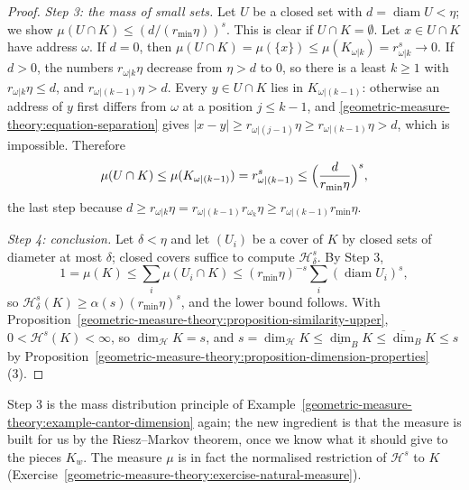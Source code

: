 \begin{proof}
\emph{Step 3: the mass of small sets.} Let $U$ be a closed set with $d = \operatorname{diam}U < \eta$; we show $\mu(U \cap K) \leq (d/(r_{\min}\eta))^s$. This is clear if $U \cap K = \emptyset$. Let
$x \in U \cap K$ have address $\omega$. If $d = 0$, then $\mu(U \cap K) = \mu(\{x\}) \leq \mu(K_{\omega|k}) = r_{\omega|k}^s \to 0$. If $d > 0$, the numbers $r_{\omega|k}\eta$ decrease from $\eta > d$ to $0$,
so there is a least $k \geq 1$ with $r_{\omega|k}\eta \leq d$, and $r_{\omega|(k - 1)}\eta > d$. Every $y \in U \cap K$ lies in $K_{\omega|(k - 1)}$: otherwise an address of $y$ first differs from
$\omega$ at a position $j \leq k - 1$, and \eqref{geometric-measure-theory:equation-separation} gives $|x - y| \geq r_{\omega|(j - 1)}\eta \geq r_{\omega|(k - 1)}\eta > d$, which is impossible. Therefore
\[
\mu(U \cap K) \leq \mu(K_{\omega|(k - 1)}) = r_{\omega|(k - 1)}^s \leq \Bigl(\frac{d}{r_{\min}\eta}\Bigr)^s,
\]
the last step because $d \geq r_{\omega|k}\eta = r_{\omega|(k - 1)}r_{\omega_k}\eta \geq r_{\omega|(k - 1)}r_{\min}\eta$.

\emph{Step 4: conclusion.} Let $\delta < \eta$ and let $(U_i)$ be a cover of $K$ by closed sets of diameter at most $\delta$; closed covers suffice to compute $\mathcal{H}^s_\delta$. By Step 3,
\[
1 = \mu(K) \leq \sum_i\mu(U_i \cap K) \leq (r_{\min}\eta)^{-s}\sum_i(\operatorname{diam}U_i)^s,
\]
so $\mathcal{H}^s_\delta(K) \geq \alpha(s)(r_{\min}\eta)^s$, and the lower bound follows. With Proposition~\ref{geometric-measure-theory:proposition-similarity-upper}, $0 < \mathcal{H}^s(K) < \infty$, so
$\dim_{\mathcal{H}}K = s$, and $s = \dim_{\mathcal{H}}K \leq \underline{\dim}_BK \leq \overline{\dim}_BK \leq s$ by Proposition~\ref{geometric-measure-theory:proposition-dimension-properties}(3).
\end{proof}

Step 3 is the mass distribution principle of Example~\ref{geometric-measure-theory:example-cantor-dimension} again; the new ingredient is that the measure is built for us by the Riesz--Markov theorem, once we
know what it should give to the pieces $K_w$. The measure $\mu$ is in fact the normalised restriction of $\mathcal{H}^s$ to $K$ (Exercise~\ref{geometric-measure-theory:exercise-natural-measure}).

